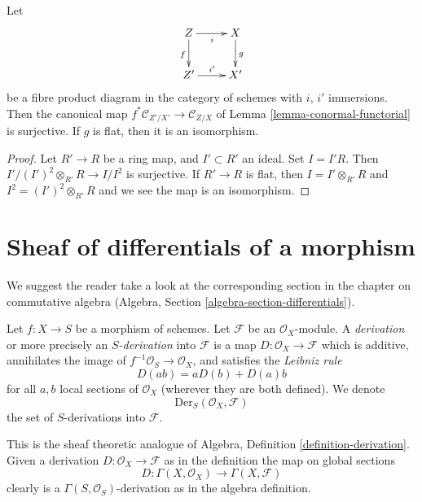 \begin{lemma}
\label{lemma-conormal-functorial-flat}
Let
$$
\xymatrix{
Z \ar[r]_i \ar[d]_f & X \ar[d]^g \\
Z' \ar[r]^{i'} & X'
}
$$
be a fibre product diagram in the category of schemes with
$i$, $i'$ immersions. Then the canonical map
$f^*\mathcal{C}_{Z'/X'} \to \mathcal{C}_{Z/X}$ of
Lemma \ref{lemma-conormal-functorial}
is surjective. If $g$ is flat, then it is an isomorphism.
\end{lemma}

\begin{proof}
Let $R' \to R$ be a ring map, and $I' \subset R'$ an ideal.
Set $I = I'R$. Then $I'/(I')^2 \otimes_{R'} R \to I/I^2$ is
surjective. If $R' \to R$ is flat, then $I = I' \otimes_{R'} R$
and $I^2 = (I')^2 \otimes_{R'} R$ and we see the map is an
isomorphism.
\end{proof}









\section{Sheaf of differentials of a morphism}
\label{section-sheaf-differentials}

\noindent
We suggest the reader take a look at the corresponding section
in the chapter on commutative algebra
(Algebra, Section \ref{algebra-section-differentials}).

\begin{definition}
\label{definition-derivation}
Let $f : X \to S$ be a morphism of schemes. Let $\mathcal{F}$
be an $\mathcal{O}_X$-module. A {\it derivation} or more precisely
an {\it $S$-derivation} into $\mathcal{F}$ is a map
$D : \mathcal{O}_X \to \mathcal{F}$ which is additive, annihilates
the image of $f^{-1}\mathcal{O}_S \to \mathcal{O}_X$, and satisfies the
{\it Leibniz rule}
$$
D(ab) = aD(b) + D(a)b
$$
for all $a, b$ local sections of $\mathcal{O}_X$
(wherever they are both defined). We denote
$$
\text{Der}_S(\mathcal{O}_X, \mathcal{F})
$$
the set of $S$-derivations into $\mathcal{F}$.
\end{definition}

\noindent
This is the sheaf theoretic analogue of
Algebra, Definition \ref{definition-derivation}.
Given a derivation $D : \mathcal{O}_X \to \mathcal{F}$
as in the definition the map on global sections
$$
D : \Gamma(X, \mathcal{O}_X) \longrightarrow \Gamma(X, \mathcal{F})
$$
clearly is a $\Gamma(S, \mathcal{O}_S)$-derivation as in
the algebra definition.

